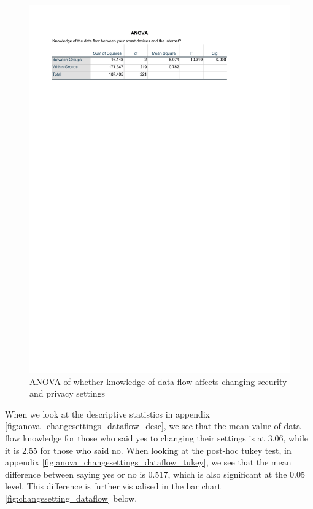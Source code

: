 \begin{figure}[!h]
    \centering
    \includegraphics[scale=0.8]{figures/tables/anova_changesettings_dataflow.pdf}
    \caption{ANOVA of whether knowledge of data flow affects changing security and privacy settings}
    \label{fig:anova_changesettings_dataflow}
\end{figure}
When we look at the descriptive statistics in appendix \ref{fig:anova_changesettings_dataflow_desc}, we see that the mean value of data flow knowledge for those who said yes to changing their settings is at 3.06, while it is 2.55 for those who said no. When looking at the post-hoc tukey test, in appendix \ref{fig:anova_changesettings_dataflow_tukey}, we see that the mean difference between saying yes or no is 0.517, which is also significant at the 0.05 level. This difference is further visualised in the bar chart \ref{fig:changesetting_dataflow} below. 

